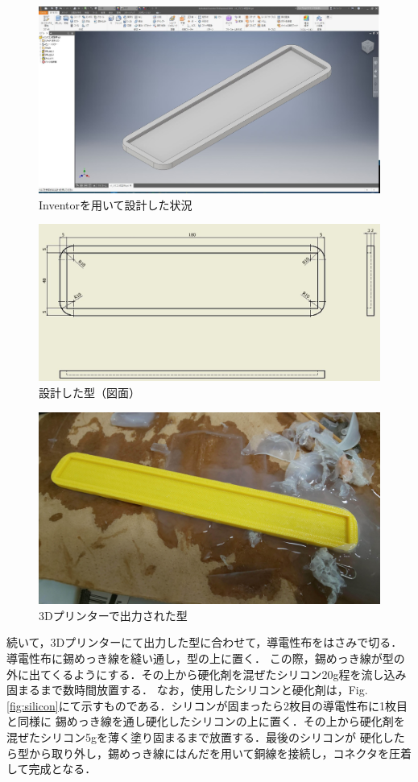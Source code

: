 \begin{figure}[h]
    \begin{center}
        \includegraphics[width=0.6\columnwidth,clip]{./2_measurement/inventor.eps}
        \caption{Inventorを用いて設計した状況}
        \label{fig:Inventor}
    \end{center}
\end{figure}
\begin{figure}[h]
    \begin{center}
        \includegraphics[width=0.6\columnwidth,clip]{./2_measurement/drowing.eps}
        \caption{設計した型（図面）}
        \label{fig:3Dprinter}
    \end{center}
\end{figure}
\begin{figure}[h]
    \begin{center}
        \includegraphics[width=0.6\columnwidth,clip]{./2_measurement/3dprint.eps}
        \caption{3Dプリンターで出力された型}
        \label{fig:3Dprinter}
    \end{center}
\end{figure}

\newpage
続いて，3Dプリンターにて出力した型に合わせて，導電性布をはさみで切る．導電性布に錫めっき線を縫い通し，型の上に置く．
この際，錫めっき線が型の外に出てくるようにする．その上から硬化剤を混ぜたシリコン20g程を流し込み固まるまで数時間放置する．
なお，使用したシリコンと硬化剤は，Fig.\ref{fig:silicon}にて示すものである．シリコンが固まったら2枚目の導電性布に1枚目と同様に
錫めっき線を通し硬化したシリコンの上に置く．その上から硬化剤を混ぜたシリコン5gを薄く塗り固まるまで放置する．最後のシリコンが
硬化したら型から取り外し，錫めっき線にはんだを用いて銅線を接続し，コネクタを圧着して完成となる．

